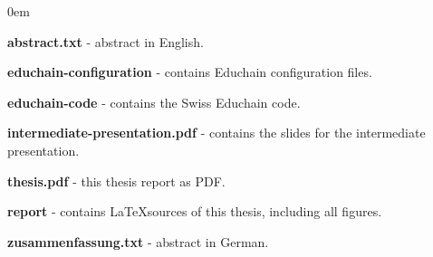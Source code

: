 \begin{description}
	\itemsep0em
	\item \textbf{abstract.txt} - abstract in English. \\
	\item \textbf{educhain-configuration} - contains Educhain configuration files. \\
	\item \textbf{educhain-code} - contains the Swiss Educhain code. \\
	\item \textbf{intermediate-presentation.pdf} - contains the slides for the intermediate presentation.\\
	\item \textbf{thesis.pdf} - this thesis report as PDF. \\
	\item \textbf{report} - contains \LaTeX sources of this thesis, including all figures. \\
	\item \textbf{zusammenfassung.txt} - abstract in German.
\end{description} 
